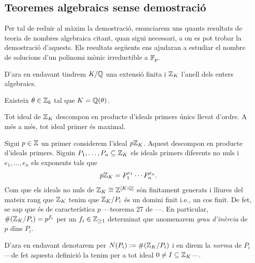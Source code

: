 \subsection{Teoremes algebraics sense demostració}

Per tal de reduir al màxim la demostració, enunciarem uns quants resultats de teoria de nombres algebraica citant, quan sigui necessari, a on es pot trobar la demostració d'aquests. Els resultats següents ens ajudaran a estudiar el nombre de solucions d'un polinomi mònic irreductible a $\mathbb{F}_p$.

D'ara en endavant tindrem $K/\mathbb{Q}$ una extensió finita i $\mathbb{Z}_K$ l'anell dels enters algebraics.
\begin{thm}
    Existeix $\theta\in \mathbb{Z}_k$ tal que $K=\mathbb{Q}(\theta)$.
\end{thm}
\begin{thm}
    Tot ideal de $\mathbb{Z}_K$ descompon en producte d'ideals primers únics llevat d'ordre. A més a més, tot ideal primer és maximal.
\end{thm}

Sigui $p\in\mathbb{Z}$ un primer considerem l'ideal $p\mathbb{Z}_K$. Aquest descompon en producte d'ideals primers. Siguin $P_1,\ldots,P_n\subseteq \mathbb{Z}_K$ els ideals primers diferents no nuls i $e_1,\ldots,e_n$ els exponents tals que
\[
p\mathbb{Z}_K=P_1^{e_1}\cdots P_n^{e_n}.
\]
Com que els ideals no nuls de $\mathbb{Z}_K\cong \mathbb{Z}^{[K:\mathbb{Q}]}$ són finitament generats i lliures del mateix rang que $\mathbb{Z}_K$ tenim que $\mathbb{Z}_K/P_i$ és un domini finit i.e., un cos finit. De fet, se sap que és de característica $p$ ---teorema 27 de \cite{NF}---. En particular, $\#(\mathbb{Z}_K/P_i)=p^{f_i}$ per un $f_i\in\mathbb{Z}_{\geq 1}$ determinat que anomenarem \emph{grau d'inèrcia} de $p$ dins $P_i$. 

D'ara en endavant denotarem per $N(P_i):=\#(\mathbb{Z}_K/P_i)$ i en direm la \emph{norma} de $P_i$ ---de fet aquesta definició la tenim per a tot ideal $0\neq I\subseteq \mathbb{Z}_K$---.

